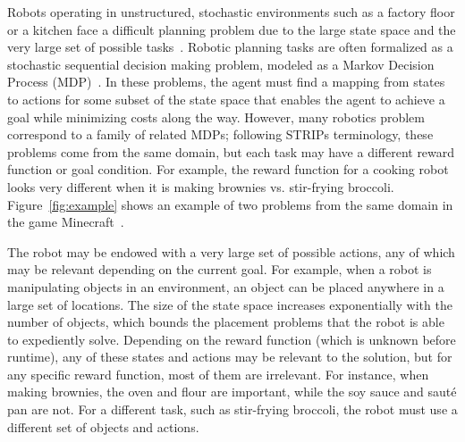 \documentclass[letterpaper]{article}
\begin{document}
Robots operating in unstructured, stochastic environments such as a
factory floor or a kitchen face a difficult planning problem due to
the large state space and the very large set of possible
tasks~\citep{bollini12,knepper13}.  Robotic planning tasks are often
formalized as a stochastic sequential decision making problem, modeled
as a Markov Decision Process (MDP)~\citep{thrun2008probabilistic}. In
these problems, the agent must find a mapping from states to actions
for some subset of the state space that enables the agent to achieve a
goal while minimizing costs along the way.  However, many robotics
problem correspond to a family of related MDPs; following STRIPs
terminology, these problems come from the same domain, but each task
may have a different reward function or goal condition.  For example,
the reward function for a cooking robot looks very different when it
is making brownies vs. stir-frying broccoli.  Figure~\ref{fig:example}
shows an example of two problems from the same domain in the game
Minecraft~\citep{minecraft}.

The robot may be endowed with a very large set of possible actions,
any of which may be relevant depending on the current goal.  For
example, when a robot is manipulating objects in an environment, an
object can be placed anywhere in a large set of locations.  The size
of the state space increases exponentially with the number of objects,
which bounds the placement problems that the robot is able to
expediently solve.  Depending on the reward function (which is unknown
before runtime), any of these states and actions may be relevant to
the solution, but for any specific reward function, most of them are
irrelevant.  For instance, when making brownies, the oven and flour
are important, while the soy sauce and saut\'{e} pan are not.  For a
different task, such as stir-frying broccoli, the robot must use a
different set of objects and actions.

\end{document}
